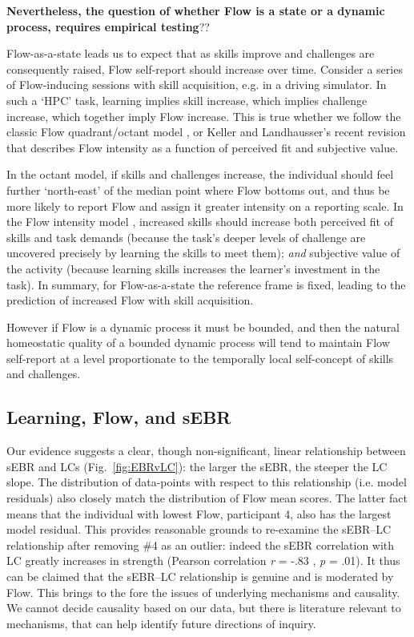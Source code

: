 \documentclass[fleqn,10pt]{wlscirep}
\begin{document}
\textbf{Nevertheless, the question of whether Flow is a state or a dynamic process, requires empirical testing}??

Flow-as-a-state leads us to expect that as skills improve and challenges are consequently raised, Flow self-report should increase over time. Consider a series of Flow-inducing sessions with skill acquisition, e.g. in a driving simulator. In such a `HPC' task, learning implies skill increase, which implies challenge increase, which together imply Flow increase. This is true whether we follow the classic Flow quadrant/octant model \cite{Massimini1988}, or Keller and Landhausser's \cite[pp-56]{Keller2012} recent revision that describes Flow intensity as a function of perceived fit and subjective value.

In the octant model, if skills and challenges increase, the individual should feel further `north-east' of the median point where Flow bottoms out, and thus be more likely to report Flow and assign it greater intensity on a reporting scale. In the Flow intensity model \cite{Keller2012}, increased skills should increase both perceived fit of skills and task demands (because the task's deeper levels of challenge are uncovered precisely by learning the skills to meet them); {\it and} subjective value of the activity (because learning skills increases the learner's investment in the task). In summary, for Flow-as-a-state the reference frame is fixed, leading to the prediction of increased Flow with skill acquisition.

However if Flow is a dynamic process it must be bounded, and then the natural homeostatic quality of a bounded dynamic process will tend to maintain Flow self-report at a level proportionate to the temporally local self-concept of skills and challenges.


\subsection*{Learning, Flow, and sEBR}
Our evidence suggests a clear, though non-significant, linear relationship between sEBR and LCs (Fig.~\ref{fig:EBRvLC}): the larger the sEBR, the steeper the LC slope. The distribution of data-points with respect to this relationship (i.e. model residuals) also closely match the distribution of Flow mean scores. The latter fact means that the individual with lowest Flow, participant 4, also has the largest model residual. This provides reasonable grounds to re-examine the sEBR--LC relationship after removing \#4 as an outlier: indeed the sEBR correlation with LC greatly increases in strength (Pearson correlation {\it r} = -.83 , {\it p} = .01). It thus can be claimed that the sEBR--LC relationship is genuine and is moderated by Flow. This brings to the fore the issues of underlying mechanisms and causality. We cannot decide causality based on our data, but there is literature relevant to mechanisms, that can help identify future directions of inquiry.
\end{document}
